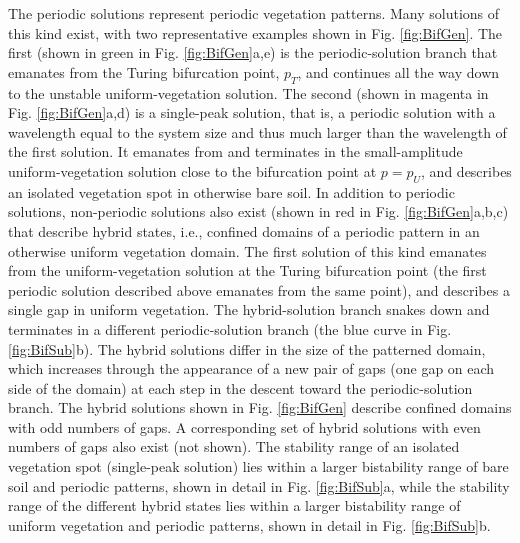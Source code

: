 \documentclass[aps,prl,preprint,superscriptaddress,floatfix]{revtex4-1}
\begin{document}
The periodic solutions represent periodic vegetation patterns. Many solutions of this kind exist, with two representative examples shown in Fig. \ref{fig:BifGen}.
The first (shown in green in Fig. \ref{fig:BifGen}a,e) is the periodic-solution branch that emanates from the Turing bifurcation point, $p_T$, and continues all the way down to the unstable uniform-vegetation solution.
The second (shown in magenta in Fig. \ref{fig:BifGen}a,d) is a single-peak solution, that is, a periodic solution with a wavelength equal to the system size and thus much larger than the wavelength of the first solution. 
It emanates from and terminates in the small-amplitude uniform-vegetation solution close to the bifurcation point at $p=p_U$, and describes an isolated vegetation spot in otherwise bare soil.
In addition to periodic solutions, non-periodic solutions also exist (shown in red in Fig. \ref{fig:BifGen}a,b,c) that describe hybrid states, i.e., confined domains of a periodic pattern in an otherwise uniform vegetation domain.  
The first solution of this kind emanates from the uniform-vegetation solution at the Turing bifurcation point (the first periodic solution described above emanates from the same point), and describes a single gap in uniform vegetation.
The hybrid-solution branch snakes down and terminates in a different periodic-solution branch (the blue curve in Fig. \ref{fig:BifSub}b). 
The hybrid solutions differ in the size of the patterned domain, which increases through the appearance of a new pair of gaps (one gap on each side of the domain) at each step in the descent toward the periodic-solution branch. 
The hybrid solutions shown in Fig. \ref{fig:BifGen} describe confined domains with odd numbers of gaps.
A corresponding set of hybrid solutions with even numbers of gaps also exist (not shown).
The stability range of an isolated vegetation spot (single-peak solution) lies within a larger bistability range of bare soil and periodic patterns, shown in detail in Fig. \ref{fig:BifSub}a,
while the stability range of the different hybrid states lies within a larger bistability range of uniform vegetation and periodic patterns, shown in detail in Fig. \ref{fig:BifSub}b.
\end{document}
